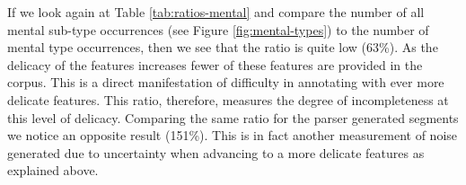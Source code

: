    \begin{table}[!ht]
    \noindent
    \end{table}

    If we look again at Table \ref{tab:ratios-mental} and compare the number of all mental sub-type occurrences (see Figure \ref{fig:mental-types}) to the number of mental type occurrences, then we see that the ratio is quite low (63\%). As the delicacy of the features increases fewer of these features are provided in the corpus. This is a direct manifestation of difficulty in annotating with ever more delicate features. This ratio, therefore, measures the degree of incompleteness at this level of delicacy. Comparing the same ratio for the parser generated segments we notice an opposite result (151\%). This is in fact another measurement of noise generated due to uncertainty when advancing to a more delicate features as explained above. 

